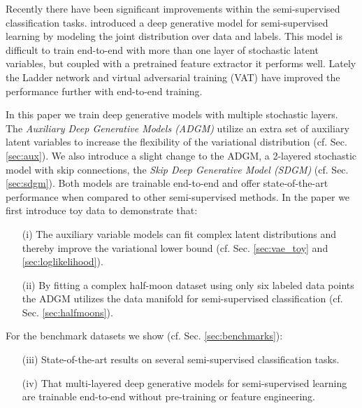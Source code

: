 \documentclass{article}
\begin{document}
Recently there have been significant improvements within the semi-supervised classification tasks. \citet{Kingma14} introduced a deep generative model for semi-supervised learning by modeling the joint distribution over data and labels. This model is difficult to train end-to-end with more than one layer of stochastic latent variables, but coupled with a pretrained feature extractor it performs well. Lately the Ladder network \citep{Rasmus15, Valpola14} and virtual adversarial training (VAT) \citep{Miyato15} have improved the performance further with end-to-end training.

In this paper we train deep generative models with multiple stochastic layers. The \emph{ Auxiliary Deep Generative Models (ADGM)} utilize an extra set of auxiliary latent variables to increase the flexibility of the variational distribution (cf. Sec. \ref{sec:aux}).  We also introduce a slight change to the ADGM, a 2-layered stochastic model with skip connections, the \emph{ Skip Deep Generative Model (SDGM)} (cf. Sec. \ref{sec:sdgm}). Both models are trainable end-to-end and offer state-of-the-art performance when compared to other semi-supervised methods.
In the paper we first introduce toy data to demonstrate that:
\vspace{-3mm}
\begin{itemize}
\setlength\itemsep{0.00em}
\item[(i)] The auxiliary variable models can fit complex latent distributions and thereby improve the variational lower bound (cf. Sec. \ref{sec:vae_toy} and \ref{sec:loglikelihood}).
\item[(ii)] By fitting a complex half-moon dataset using only six labeled data points the ADGM utilizes the data manifold for semi-supervised classification (cf. Sec. \ref{sec:halfmoons}).
\end{itemize}
\vspace{-3mm}
For the benchmark datasets we show (cf. Sec. \ref{sec:benchmarks}):
\vspace{-3mm}
\begin{itemize}
\setlength\itemsep{0.00em}
\item[(iii)] State-of-the-art results on several semi-supervised classification tasks. 
\item[(iv)] That multi-layered deep generative models for semi-supervised learning are trainable end-to-end without pre-training or feature engineering.
\end{itemize}
\end{document}
